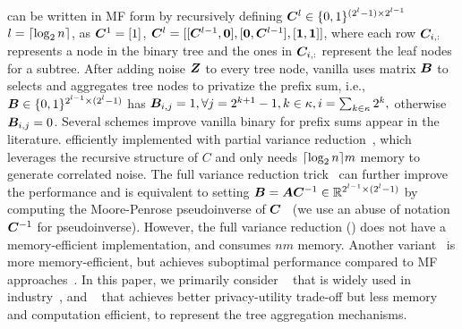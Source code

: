 \paragraph{\treeagg} can be written in MF form by recursively defining ${\bm{C}}^l \in \{0 ,1\}^{(2^l-1) \times 2^{l-1}}$ $l=\lceil\log_2 n\rceil$, as ${\bm{C}}^1 = [1]$, ${\bm{C}}^l = [[{\bm{C}}^{l-1}, \bm{0}], [\bm{0}, {\bm{C}}^{l-1}], [\bm{1}, \bm{1}]]$, where each row ${\bm{C}}_{i,:}$ represents a node in the binary tree and the ones in ${\bm{C}}_{i,:}$ represent the leaf nodes for a subtree. After adding noise ${\bm{Z}}$ to every tree node, vanilla \treeagg uses matrix ${\bm{B}}$ to selects and aggregates tree nodes to privatize the prefix sum, i.e., ${\bm{B}} \in \{0, 1\}^{2^{l-1} \times (2^l-1) }$ has ${\bm{B}}_{i,j}=1, \forall j=2^{k+1}-1, k \in \kappa, i = \sum_{k \in \kappa} 2^k,$ otherwise ${\bm{B}}_{i,j}=0$. Several schemes improve vanilla binary \treeagg for prefix sums appear in the literature.  \citet{kairouz21practical} efficiently implemented \treeagg with partial variance reduction~\citep{honaker15efficient}, which leverages the recursive structure of $C$ and only needs $\lceil\log_2 n\rceil m$ memory to generate correlated noise. The full variance reduction trick~\citep{honaker15efficient} can further improve the performance and is equivalent to setting ${\bm{B}}={\bm{A}} {\bm{C}}^{-1} \in \mathbb{R}^{2^{l-1} \times (2^l-1)}$ by computing the Moore-Penrose pseudoinverse of ${\bm{C}}$~\citep{denisov22matfact} (we use an abuse of notation ${\bm{C}}^{-1}$ for pseudoinverse). However, the full variance reduction \treeagg (\tafull) does not have a memory-efficient implementation, and consumes $n m$ memory. Another variant~\citep{andersson24smooth} is more memory-efficient, but achieves suboptimal performance compared to MF approaches~\citep{fichtenberger2022constant}. In this paper, we primarily consider \treeagg~\citep{kairouz21practical} that is widely used in industry~\citep{xu2023federated}, and \tafull~\citep{denisov22matfact} that achieves better privacy-utility trade-off but less memory and computation efficient, to represent the tree aggregation mechanisms.

